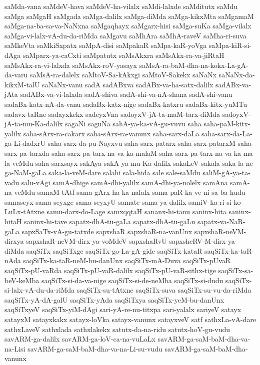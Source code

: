 {saMda-vana
saMdeV-hava
saMdeV-ha-vilalx
saMdi-lalxde
saMditutx
saMdu
saMga
saMgaH
saMgada
saMga-dalilx
saMga-diMda
saMga-kikxMta
saMgamaM
saMga-na-ba-sa-va-NaNxna
saMgaqhayx
saMgarx-hisi
saMga-suKa
saMga-vilalx
saMga-vi-lalx-vA-du-da-riMda
saMgavu
saMhAra
saMhA-raveV
saMha-ri-suva
saMkeVta
saMkiSxpatx
saMpA-disi
saMpakaR
saMpa-kaR-yoVga
saMpa-kiR-si-dAga
saMparx-ya-caCxti
saMpatutx
saMsAkxra
saMsAkx-ra-va-jiRtaH
saMsAkx-ra-vi-lalxda
saMsAkx-roV-yasayx
saMsA-ra-baM-dha-na-kokx-La-gA-da-varu
saMsA-ra-dalelx
saMtoV-Sa-kAkxgi
saMtoV-Sakekx
saNaNx
saNaNx-da-kikxM-talU
saNaNx-vanu
sadA
sadABxva
sadABx-va-ha-satx-dalilx
sadABx-va-jAta
sadABx-va-vi-lalxda
sadA-shiva
sadA-shi-va-nA-shana
sadA-shi-vanu
sadaBx-katx-nA-da-vanu
sadaBx-katx-nige
sadaBx-katxru
sadaBx-kitx-yuMTu
sadavx-taRne
sadayxkekx
sadeyxVna
sadoyxV-jA-ta-maM-tarx-diMda
sadoyxV-jA-ta-mu-Ka-dalilx
sagaNi
saguNa
sahA-ya-ka-vA-gu-vuvu
saha
saha-paM-kitx-yalilx
saha-sArx-ra-cakarx
saha-sArx-ra-vanunx
saha-sarx-daLa
saha-sarx-da-La-ga-Li-dadxrU
saha-sarx-da-pu-Nayxvu
saha-sarx-patarx
saha-sarx-patarxM
saha-sarx-pa-tarxda
saha-sarx-pa-tarx-na-va-ka-malaM
saha-sarx-pa-tarx-na-va-ka-ma-la-veMdu
saha-sarxsayx
sakAya
sakA-ya-mu-Ka-dalilx
sakaLeV
sakala
saka-la-ne-ga-NaM-gaLa
saka-la-veM-dare
salahi
sala-hida
sale
sale-saMdu
saliM-gA-ya-ta-vadu
salu-vAgi
samA-dhige
samA-dhi-yalilx
samA-dhi-ya-nolelx
samAna
samA-na-veMdu
samaM-tAtf
sama-gArx-ha-ka-nalalx
sama-paR-ka-ve-ni-sa-ba-hudu
samaseyx
sama-seyxge
sama-seyxyU
samate
sama-ya-dalilx
samiV-ka-ri-si-ko-LuLx-tAtxne
samu-darx-do-Lage
samxqqtaH
sananx-hi-tanu
saninx-hita
saninx-hitaH
saninx-hi-tave
sapatx-dhA-tu-gaLa
sapatx-dhA-tu-gaLu
sapatx-va-NaR-gaLa
sapxSaTx-vA-gu-tatxde
sapxshaR
sapxshaR-na-vanUnx
sapxshaR-neVM-dirxya
sapxshaR-neVM-dirx-ya-voMdeV
sapxshaRvU
sapxsheRV-M-dirx-ya-diMda
saqSiTx
saqSiTxge
saqSiTx-go-La-gA-gide
saqSiTx-kataR
saqSiTx-ka-taR-nAda
saqSiTx-ka-taR-neM-bu-danUnx
saqSiTx-mA-Duva
saqSiTx-pUvaR
saqSiTx-pU-vaRda
saqSiTx-pU-vaR-dalilx
saqSiTx-pU-vaR-sithx-tige
saqSiTx-sa-beV-keMba
saqSiTx-si-da-va-nige
saqSiTx-si-de-neMba
saqSiTx-si-dudu
saqSiTx-si-lalx-vA-du-da-riMda
saqSiTx-su-tAtxne
saqSiTx-suva
saqSiTx-su-vu-da-riMda
saqSiTx-yA-dA-galU
saqSiTx-yAda
saqSiTxya
saqSiTx-yeM-bu-danUnx
saqSiTxyeV
saqSiTx-yiM-dAgi
sari-yA-re-nu-titxpa
sari-yalalx
sariyeV
satayx
satayxM
satayxkakx
satayx-loVka
satayx-vanunx
satayxveV
satf
sathxLa-vA-dare
sathxLaveV
sathxlada
sathxlakekx
satutx-da-na-ridu
satutx-hoV-gu-vudu
savARM-ga-dalilx
savARM-ga-loV-ca-na-vuLaLx
savARM-ga-saM-baM-dha-va-na-Lisi
savARM-ga-saM-baM-dha-va-na-Li-su-vudu
savARM-ga-saM-baM-dha-vanunx
}

